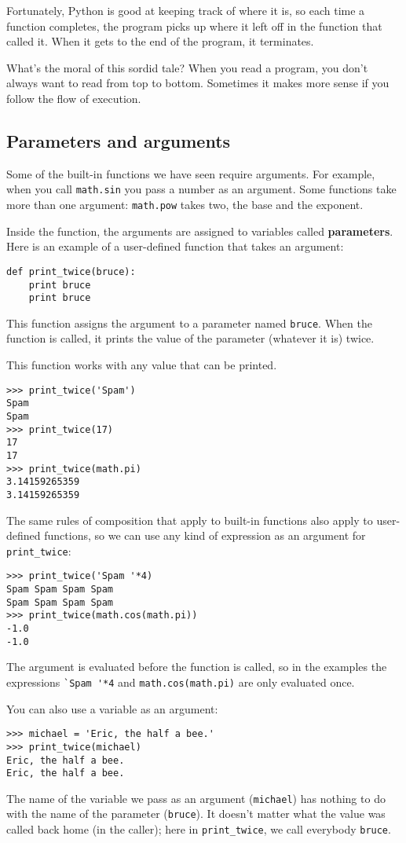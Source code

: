 \documentclass{article}
\begin{document}
Fortunately, Python is good at keeping track of where it is, so each
time a function completes, the program picks up where it left off in
the function that called it. When it gets to the end of the program,
it terminates.

What’s the moral of this sordid tale? When you read a program, you
don’t always want to read from top to bottom. Sometimes it makes more
sense if you follow the flow of execution.

\subsection{Parameters and arguments}
Some of the built-in functions we have seen require arguments. For
example, when you call \verb|math.sin| you pass a number as an argument. Some
functions take more than one argument:
\verb|math.pow| takes two, the base and the exponent.

Inside the function, the arguments are assigned to variables called
\textbf{parameters}. Here is an example of a user-defined function that takes
an argument:
\begin{verbatim}
def print_twice(bruce):
    print bruce
    print bruce
\end{verbatim}
This function assigns the argument to a parameter named \verb|bruce|.
When the function is called, it prints the value of the parameter
(whatever it is) twice.

This function works with any value that can be printed.
\begin{verbatim}
>>> print_twice('Spam')
Spam
Spam
>>> print_twice(17)
17
17
>>> print_twice(math.pi)
3.14159265359
3.14159265359
\end{verbatim}
The same rules of composition that apply to built-in functions
also apply to user-defined functions, so we can use any kind
of expression as an argument for \verb|print_twice|:
\begin{verbatim}
>>> print_twice('Spam '*4)
Spam Spam Spam Spam
Spam Spam Spam Spam
>>> print_twice(math.cos(math.pi))
-1.0
-1.0
\end{verbatim}
The argument is evaluated before the function is called, so in
the examples the expressions \verb|`Spam '*4| and \verb|math.cos(math.pi)|
are only evaluated once.

You can also use a variable as an argument:
\begin{verbatim}
>>> michael = 'Eric, the half a bee.'
>>> print_twice(michael)
Eric, the half a bee.
Eric, the half a bee.
\end{verbatim}
The name of the variable we pass as an argument (\verb|michael|) has
nothing to do with the name of the parameter (\verb|bruce|). It
doesn’t matter what the value was called back home (in the
caller); here in \verb|print_twice|, we call everybody \verb|bruce|.
\end{document}
